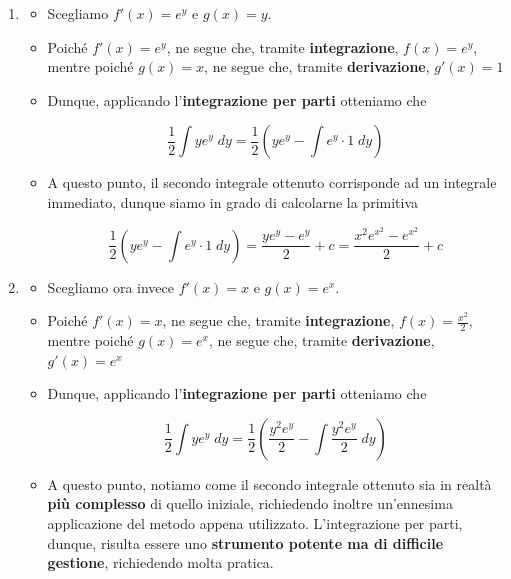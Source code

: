 \documentclass[a4paper, 12pt]{report}
\begin{document}
    \begin{enumerate}
        \item \begin{itemize}
            \item Scegliamo $f'(x) = e^y$ e $g(x) = y$.
            \item Poiché $f'(x) = e^y$, ne segue che, tramite \textbf{integrazione}, $f(x) = e^y$, mentre poiché $g(x) = x$, ne segue che, tramite \textbf{derivazione}, $g'(x) = 1$
            \item Dunque, applicando l'\textbf{integrazione per parti} otteniamo che
            
            \[ \frac{1}{2} \int y e^{y} \; dy = \frac{1}{2} \left ( ye^y - \int e^y \cdot 1 \; dy \right )\]
            
            \item A questo punto, il secondo integrale ottenuto corrisponde ad un integrale immediato, dunque siamo in grado di calcolarne la primitiva
            
            \[ \frac{1}{2} \left ( ye^y - \int e^y \cdot 1 \; dy \right ) = \frac{ye^y - e^y}{2} + c= \frac{x^2e^{x^2} - e^{x^2}}{2} + c\]
        \end{itemize}
        
        \quad
        
        \item \begin{itemize}
            \item Scegliamo ora invece $f'(x) = x$ e $g(x) = e^x$.
            \item Poiché $f'(x) = x$, ne segue che, tramite \textbf{integrazione}, $f(x) = \frac{x^2}{2}$, mentre poiché $g(x) = e^x$, ne segue che, tramite \textbf{derivazione}, $g'(x) = e^x$
            \item Dunque, applicando l'\textbf{integrazione per parti} otteniamo che
            
            \[ \frac{1}{2} \int y e^{y} \; dy = \frac{1}{2} \left ( \frac{y^2 e^y}{2} - \int \frac{y^2 e^y}{2}  \; dy \right )\]
            
            \item A questo punto, notiamo come il secondo integrale ottenuto sia in realtà \textbf{più complesso} di quello iniziale, richiedendo inoltre un'ennesima applicazione del metodo appena utilizzato. L'integrazione per parti, dunque, risulta essere uno \textbf{strumento potente ma di difficile gestione}, richiedendo molta pratica.
        \end{itemize}
    \end{enumerate}
    
\end{document}
